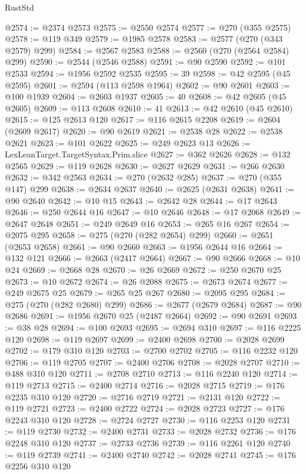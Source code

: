 \begin{lexlean}{RustStd}
\begin{coremodule}
@2574 := @2374 @2573
@2575 := @2550 @2574
@2577 := @270 (@355 @2575)
@2578 := @119 @349
@2579 := @1985 @2578
@2583 := @2577 (@270 (@343 @2579) @299)
@2584 := @2567 @2583
@2588 := @2560 (@270 (@2564 @2584) @299)
@2590 := @2544 (@2546 @2588)
@2591 := @90 @2590
@2592 := @101 @2533
@2594 := @1956 @2592 @2535
@2595 := 39
@2598 := @42 @2595 (@45 @2595)
@2601 := @2594 (@113 @2598 @1964)
@2602 := @90 @2601
@2603 := @100 @1939
@2604 := @2603 @1937
@2605 := 40
@2608 := @42 @2605 (@45 @2605)
@2609 := @113 @2608
@2610 := 41
@2613 := @42 @2610 (@45 @2610)
@2615 := @125 @2613 @120
@2617 := @116 @2615 @2208
@2619 := @2604 (@2609 @2617)
@2620 := @90 @2619
@2621 := @2538 @28
@2622 := @2538 @2621
@2623 := @101 @2622
@2625 := @249 @2623 @13
@2626 := LexLeanTarget.TargetSyntax.Prim.slice
@2627 := @362 @2626
@2628 := @132 @2565
@2629 := @119 @2628
@2630 := @2627 @2629
@2631 := @266 @2630
@2632 := @342 @2563
@2634 := @270 (@2632 @285)
@2637 := @270 (@355 @147) @299
@2638 := @2634 @2637
@2640 := @2625 (@2631 @2638)
@2641 := @90 @2640
@2642 := @10 @15
@2643 := @2642 @28
@2644 := @17 @2643
@2646 := @250 @2644 @16
@2647 := @10 @2646
@2648 := @17 @2068
@2649 := @2647 @2648
@2651 := @249 @2649 @16
@2653 := @265 @16 @267
@2654 := @2075 @295
@2658 := @275 (@270 (@282 @2654) @299)
@2660 := @2651 (@2653 @2658)
@2661 := @90 @2660
@2663 := @1956 @2644 @16
@2664 := @132 @121
@2666 := @2663 (@2417 @2664)
@2667 := @90 @2666
@2668 := @10 @24
@2669 := @2668 @28
@2670 := @26 @2669
@2672 := @250 @2670 @25
@2673 := @10 @2672
@2674 := @26 @2088
@2675 := @2673 @2674
@2677 := @249 @2675 @25
@2679 := @265 @25 @267
@2680 := @2095 @295
@2684 := @275 (@270 (@282 @2680) @299)
@2686 := @2677 (@2679 @2684)
@2687 := @90 @2686
@2691 := @1956 @2670 @25 (@2487 @2664)
@2692 := @90 @2691
@2693 := @38 @28
@2694 := @100 @2693
@2695 := @2694 @310
@2697 := @116 @2225 @120
@2698 := @119 @2697
@2699 := @2400 @2698
@2700 := @2028 @2699
@2702 := @179 @310 @120
@2703 := @2700 @2702
@2705 := @116 @2232 @120
@2706 := @119 @2705
@2707 := @2400 @2706
@2708 := @2028 @2707
@2710 := @488 @310 @120
@2711 := @2708 @2710
@2713 := @116 @2240 @120
@2714 := @119 @2713
@2715 := @2400 @2714
@2716 := @2028 @2715
@2719 := @176 @2235 @310 @120
@2720 := @2716 @2719
@2721 := @2131 @120
@2722 := @119 @2721
@2723 := @2400 @2722
@2724 := @2028 @2723
@2727 := @176 @2243 @310 @120
@2728 := @2724 @2727
@2730 := @116 @2253 @120
@2731 := @119 @2730
@2732 := @2400 @2731
@2733 := @2028 @2732
@2736 := @176 @2248 @310 @120
@2737 := @2733 @2736
@2739 := @116 @2261 @120
@2740 := @119 @2739
@2741 := @2400 @2740
@2742 := @2028 @2741
@2745 := @176 @2256 @310 @120

\end{coremodule}
\end{lexlean}
